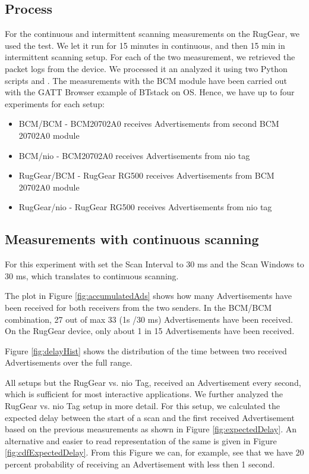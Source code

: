 \documentclass[a4paper,titlepage,oneside,12pt]{amsart} %
\begin{document}
\subsection{Process}
For the continuous and intermittent scanning measurements on the RugGear, we used the  test. We let it run for 15 minutes in continuous, and then 15 min in intermittent scanning setup. For each of the two measurement, we retrieved the packet logs from the device.  We processed it an analyzed it using two Python scripts  and . The measurements with the BCM module have been carried out with the GATT Browser example of BTstack on OS. Hence, we have up to four experiments for each setup:
\begin{itemize}
\item BCM/BCM - BCM20702A0 receives Advertisements from second BCM 20702A0 module 
\item BCM/nio - BCM20702A0 receives Advertisements from nio tag
\item RugGear/BCM - RugGear RG500 receives Advertisements from BCM 20702A0 module
\item RugGear/nio - RugGear RG500 receives Advertisements from nio tag 
\end{itemize}

\subsection{Measurements with continuous scanning}
For this experiment with set the Scan Interval to 30 ms and the Scan Windows to 30 ms, which translates to continuous scanning.

The plot in Figure \ref{fig:accumulatedAds} shows how many Advertisements have been received for both receivers from the two senders. In the BCM/BCM combination, 27 out of max 33 (1s /30 ms) Advertisements have been received. On the RugGear device, only about 1 in 15 Advertisements have been received.

Figure \ref{fig:delayHist} shows the distribution of the time between two received Advertisements over the full range.
 
All setups but the RugGear vs. nio Tag, received an Advertisement every second, which is sufficient for most interactive applications. We further analyzed the RugGear vs. nio Tag setup in more detail. For this setup, we calculated the expected delay between the start of a scan and the first received Advertisement based on the previous measurements as shown in Figure \ref{fig:expectedDelay}. An alternative and easier to read representation of the same is given in Figure \ref{fig:cdfExpectedDelay}. From this Figure we can, for example, see that we have 20 percent probability of receiving an Advertisement with less then 1 second.
\end{document}

